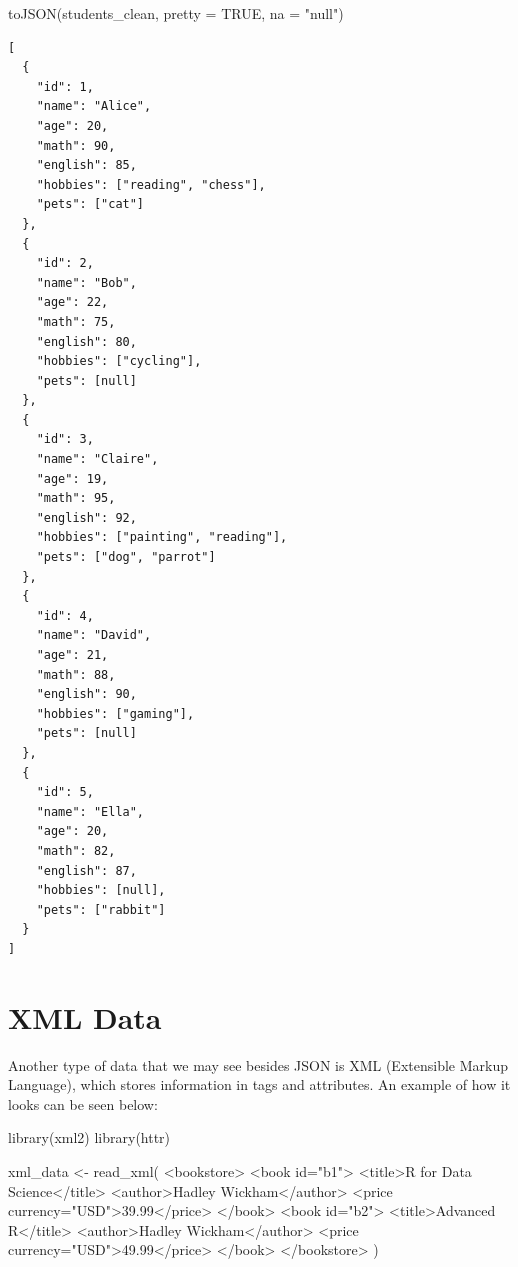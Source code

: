 \documentclass[
  letterpaper,
  DIV=11,
  numbers=noendperiod]{scrreprt}
\newenvironment{Shaded}{\begin{snugshade}}{\end{snugshade}}
\newcommand{\AttributeTok}[1]{\textcolor[rgb]{0.40,0.45,0.13}{#1}}
\newcommand{\ConstantTok}[1]{\textcolor[rgb]{0.56,0.35,0.01}{#1}}
\newcommand{\FunctionTok}[1]{\textcolor[rgb]{0.28,0.35,0.67}{#1}}
\newcommand{\NormalTok}[1]{\textcolor[rgb]{0.00,0.23,0.31}{#1}}
\newcommand{\OtherTok}[1]{\textcolor[rgb]{0.00,0.23,0.31}{#1}}
\newcommand{\StringTok}[1]{\textcolor[rgb]{0.13,0.47,0.30}{#1}}
\begin{document}
\begin{Shaded}
\begin{Highlighting}[]
\FunctionTok{toJSON}\NormalTok{(students\_clean, }\AttributeTok{pretty =} \ConstantTok{TRUE}\NormalTok{, }\AttributeTok{na =} \StringTok{"null"}\NormalTok{)}
\end{Highlighting}
\end{Shaded}

\begin{verbatim}
[
  {
    "id": 1,
    "name": "Alice",
    "age": 20,
    "math": 90,
    "english": 85,
    "hobbies": ["reading", "chess"],
    "pets": ["cat"]
  },
  {
    "id": 2,
    "name": "Bob",
    "age": 22,
    "math": 75,
    "english": 80,
    "hobbies": ["cycling"],
    "pets": [null]
  },
  {
    "id": 3,
    "name": "Claire",
    "age": 19,
    "math": 95,
    "english": 92,
    "hobbies": ["painting", "reading"],
    "pets": ["dog", "parrot"]
  },
  {
    "id": 4,
    "name": "David",
    "age": 21,
    "math": 88,
    "english": 90,
    "hobbies": ["gaming"],
    "pets": [null]
  },
  {
    "id": 5,
    "name": "Ella",
    "age": 20,
    "math": 82,
    "english": 87,
    "hobbies": [null],
    "pets": ["rabbit"]
  }
] 
\end{verbatim}


\chapter{XML Data}\label{xml-data}

Another type of data that we may see besides JSON is XML (Extensible
Markup Language), which stores information in tags and attributes. An
example of how it looks can be seen below:

\begin{Shaded}
\begin{Highlighting}[]
\FunctionTok{library}\NormalTok{(xml2)}
\FunctionTok{library}\NormalTok{(httr)}

\NormalTok{xml\_data }\OtherTok{\textless{}{-}} \FunctionTok{read\_xml}\NormalTok{(}\StringTok{\textquotesingle{}}
\StringTok{\textless{}bookstore\textgreater{}}
\StringTok{  \textless{}book id="b1"\textgreater{}}
\StringTok{    \textless{}title\textgreater{}R for Data Science\textless{}/title\textgreater{}}
\StringTok{    \textless{}author\textgreater{}Hadley Wickham\textless{}/author\textgreater{}}
\StringTok{    \textless{}price currency="USD"\textgreater{}39.99\textless{}/price\textgreater{}}
\StringTok{  \textless{}/book\textgreater{}}
\StringTok{  \textless{}book id="b2"\textgreater{}}
\StringTok{    \textless{}title\textgreater{}Advanced R\textless{}/title\textgreater{}}
\StringTok{    \textless{}author\textgreater{}Hadley Wickham\textless{}/author\textgreater{}}
\StringTok{    \textless{}price currency="USD"\textgreater{}49.99\textless{}/price\textgreater{}}
\StringTok{  \textless{}/book\textgreater{}}
\StringTok{\textless{}/bookstore\textgreater{}}
\StringTok{\textquotesingle{}}\NormalTok{)}
\end{Highlighting}
\end{Shaded}
\end{document}
